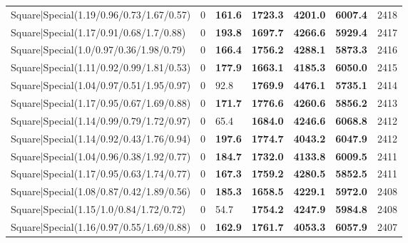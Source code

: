 \begin{tabular}{lrllllr}
 Square|Special(1.19/0.96/0.73/1.67/0.57)                      &             0   & \textbf{161.6} & \textbf{1723.3} & \textbf{4201.0} & \textbf{6007.4} &         2418 \\
 Square|Special(1.17/0.91/0.68/1.7/0.88)                       &             0   & \textbf{193.8} & \textbf{1697.7} & \textbf{4266.6} & \textbf{5929.4} &         2417 \\
 Square|Special(1.0/0.97/0.36/1.98/0.79)                       &             0   & \textbf{166.4} & \textbf{1756.2} & \textbf{4288.1} & \textbf{5873.3} &         2416 \\
 Square|Special(1.11/0.92/0.99/1.81/0.53)                      &             0   & \textbf{177.9} & \textbf{1663.1} & \textbf{4185.3} & \textbf{6050.0} &         2415 \\
 Square|Special(1.04/0.97/0.51/1.95/0.97)                      &             0   & 92.8           & \textbf{1769.9} & \textbf{4476.1} & \textbf{5735.1} &         2414 \\
 Square|Special(1.17/0.95/0.67/1.69/0.88)                      &             0   & \textbf{171.7} & \textbf{1776.6} & \textbf{4260.6} & \textbf{5856.2} &         2413 \\
 Square|Special(1.14/0.99/0.79/1.72/0.97)                      &             0   & 65.4           & \textbf{1684.0} & \textbf{4246.6} & \textbf{6068.8} &         2412 \\
 Square|Special(1.14/0.92/0.43/1.76/0.94)                      &             0   & \textbf{197.6} & \textbf{1774.7} & \textbf{4043.2} & \textbf{6047.9} &         2412 \\
 Square|Special(1.04/0.96/0.38/1.92/0.77)                      &             0   & \textbf{184.7} & \textbf{1732.0} & \textbf{4133.8} & \textbf{6009.5} &         2411 \\
 Square|Special(1.17/0.95/0.63/1.74/0.77)                      &             0   & \textbf{167.3} & \textbf{1759.2} & \textbf{4280.5} & \textbf{5852.5} &         2411 \\
 Square|Special(1.08/0.87/0.42/1.89/0.56)                      &             0   & \textbf{185.3} & \textbf{1658.5} & \textbf{4229.1} & \textbf{5972.0} &         2408 \\
 Square|Special(1.15/1.0/0.84/1.72/0.72)                       &             0   & 54.7           & \textbf{1754.2} & \textbf{4247.9} & \textbf{5984.8} &         2408 \\
 Square|Special(1.16/0.97/0.55/1.69/0.88)                      &             0   & \textbf{162.9} & \textbf{1761.7} & \textbf{4053.3} & \textbf{6057.9} &         2407 \\

\end{tabular}
